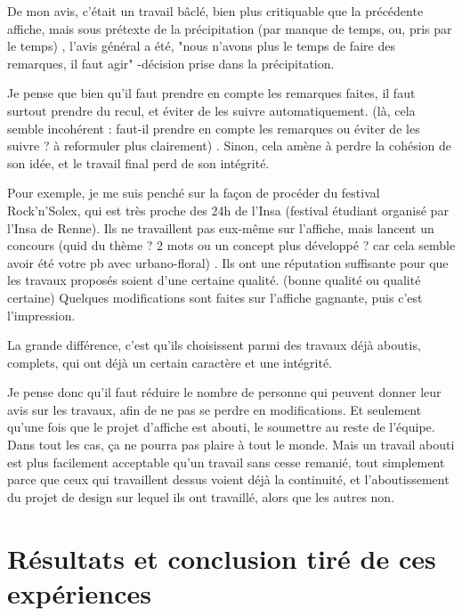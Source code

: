         De mon avis, c'était un travail bâclé, bien plus critiquable que la précédente affiche, mais sous prétexte de la précipitation (par manque de temps, ou, pris par le temps) , l'avis général a été, "nous n'avons plus le temps de faire des remarques, il faut agir" -décision prise dans la précipitation. 
        
        Je pense que bien qu'il faut prendre en compte les remarques faites, il faut surtout prendre du recul, et éviter de les suivre automatiquement. (là, cela semble incohérent : faut-il prendre en compte les remarques ou éviter de les suivre ? à reformuler plus clairement) . Sinon, cela amène à perdre la cohésion de son idée, et le travail final perd de son intégrité.
        
        Pour exemple, je me suis penché sur la façon de procéder du festival Rock'n'Solex, qui est très proche des 24h de l'Insa (festival étudiant organisé par l'Insa de Renne).
        Ils ne travaillent pas eux-même sur l'affiche, mais lancent un concours (quid du thème ? 2 mots ou un concept plus développé ? car cela semble avoir été votre pb avec urbano-floral) . Ils ont une réputation suffisante pour que les travaux proposés soient d'une certaine qualité. (bonne qualité ou qualité certaine)
        Quelques modifications sont faites sur l'affiche gagnante, puis c'est l'impression.
        
        La grande différence, c'est qu'ils choisissent parmi des travaux déjà aboutis, complets, qui ont déjà un certain caractère et une intégrité.
        
        Je pense donc qu'il faut réduire le nombre de personne qui peuvent donner leur avis sur les travaux, afin de ne pas se perdre en modifications.
        Et seulement qu'une fois que le projet d'affiche est  abouti, le soumettre au reste de l'équipe. Dans tout les cas, ça ne pourra pas plaire à tout le monde. Mais un travail abouti est plus facilement acceptable qu'un travail sans cesse remanié, tout simplement parce que ceux qui travaillent dessus voient déjà la continuité, et l'aboutissement du projet de design sur lequel ils ont travaillé, alors que les autres non.
        
\section{Résultats et conclusion tiré de ces expériences}


